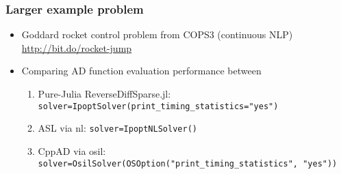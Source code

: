 \documentclass[compressed,dvips,letter]{beamer}
\begin{document}
\begin{frame}[fragile]\frametitle{Larger example problem}
\begin{itemize}
\item Goddard rocket control problem from COPS3 (continuous NLP)
\url{http://bit.do/rocket-jump}
\item Comparing AD function evaluation performance between
\begin{enumerate}
\item Pure-Julia ReverseDiffSparse.jl: {\footnotesize \texttt{solver=IpoptSolver(print\_timing\_statistics="yes")}}
\item ASL via nl: {\footnotesize \texttt{solver=IpoptNLSolver()}}
\item CppAD via osil: {\footnotesize \texttt{solver=OsilSolver(OSOption("print\_timing\_statistics", "yes"))}}
\end{enumerate}
\end{itemize}
\end{frame}
%
%
\end{document}
